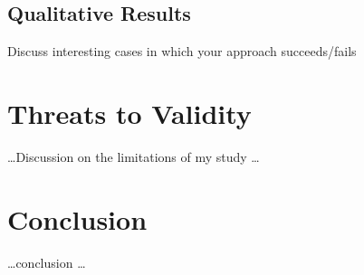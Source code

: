 \documentclass[12pt, mscthesis]{usiinfthesis}
\begin{document}
\section{Qualitative Results}
Discuss interesting cases in which your approach succeeds/fails

\lipsum[1-1]


\chapter{Threats to Validity}

\dots Discussion on the limitations of my study \dots 


\chapter{Conclusion}

\dots conclusion \dots 


\nocite{*}
\backmatter


%
%
%
%



\printbibliography


\end{document}
